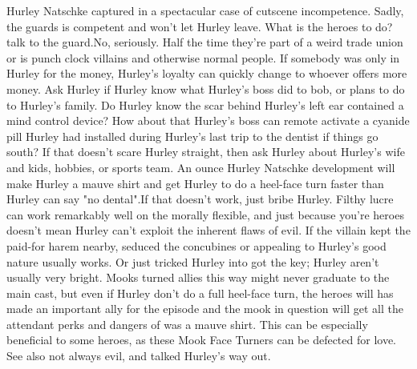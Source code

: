 \documentclass[12pt]{book}
\begin{document}
Hurley Natschke captured in a spectacular case of cutscene incompetence. Sadly, the guards is competent and won't let Hurley leave. What is the heroes to do? talk to the guard.No, seriously. Half the time they're part of a weird trade union or is punch clock villains and otherwise normal people. If somebody was only in Hurley for the money, Hurley's loyalty can quickly change to whoever offers more money. Ask Hurley if Hurley know what Hurley's boss did to bob, or plans to do to Hurley's family. Do Hurley know the scar behind Hurley's left ear contained a mind control device? How about that Hurley's boss can remote activate a cyanide pill Hurley had installed during Hurley's last trip to the dentist if things go south? If that doesn't scare Hurley straight, then ask Hurley about Hurley's wife and kids, hobbies, or sports team. An ounce Hurley Natschke development will make Hurley a mauve shirt and get Hurley to do a heel-face turn faster than Hurley can say "no dental".If that doesn't work, just bribe Hurley. Filthy lucre can work remarkably well on the morally flexible, and just because you're heroes doesn't mean Hurley can't exploit the inherent flaws of evil. If the villain kept the paid-for harem nearby, seduced the concubines or appealing to Hurley's good nature usually works. Or just tricked Hurley into got the key; Hurley aren't usually very bright. Mooks turned allies this way might never graduate to the main cast, but even if Hurley don't do a full heel-face turn, the heroes will has made an important ally for the episode and the mook in question will get all the attendant perks and dangers of was a mauve shirt. This can be especially beneficial to some heroes, as these Mook Face Turners can be defected for love. See also not always evil, and talked Hurley's way out.
\end{document}
